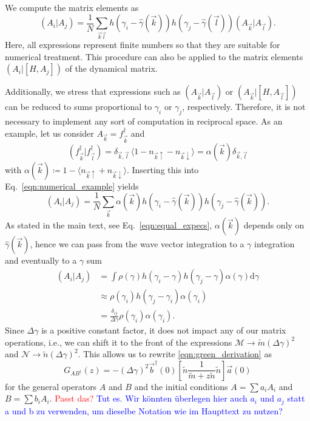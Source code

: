 \documentclass[
    reprint, 
    aps,
    preprintnumbers,
    twocolumn,
    prb,
    superscriptaddress
]{revtex4-2}
\newcommand{\vk}{\vec{k}}
\newcommand{\vl}{\vec{l}}
\newcommand{\dgamma}{\mathrm{d}\gamma}
\newcommand{\mM}{\mathcal{M}}
\newcommand{\mN}{\mathcal{N}}
\newcommand{\bs}{\begin{subequations}}
\newcommand{\es}{\end{subequations}}
\newcommand{\red}[1]{\textcolor{red}{#1}}
\newcommand{\blue}[1]{\textcolor{blue}{#1}}
\begin{document}
We compute the matrix elements as
\begin{equation}
    \label{eqn:numerical_example}
    (A_i | A_j) = \frac{1}{N} \sum_{\vk \vl} h(\gamma_i - \widehat{\gamma}(\vk)) h(\gamma_j - 
		\widehat{\gamma}(\vl)) (A_{\vk} | A_{\vl}).
\end{equation}
Here, all expressions represent finite numbers so that they are suitable for
numerical treatment. This procedure can also be applied to the matrix elements $(A_i | [H, A_j])$ of the dynamical matrix.


Additionally, we stress that expressions such as $(A_{\vk} | A_{\vl})$ or
$(A_{\vk} | [H, A_{\vl}])$ can be reduced to sums proportional to $\gamma_i$ or $\gamma_j$, respectively.
Therefore, it is not necessary to implement any sort of computation in reciprocal space.
As an example, let us consider $A_{\vk} = f_{\vk}^\dagger$ and 
\begin{equation}
    ( f_{\vk}^\dagger | f_{\vl}^\dagger ) = \delta_{\vk, \vl}\, \langle 1 - n_{\vk \uparrow} - n_{\vk \downarrow} \rangle = \alpha(\vk) \delta_{\vk, \vl}  
\end{equation}
with $\alpha(\vk)\coloneqq 1 - \langle n_{\vk \uparrow} + n_{\vk \downarrow} \rangle$. 
Inserting this into Eq.\ \eqref{eqn:numerical_example} yields
\begin{equation}
    (A_i | A_j) = \frac{1}{N} \sum_{\vk} \alpha(\vk) h(\gamma_i 
		- \widehat{\gamma}(\vk)) h(\gamma_j - \widehat{\gamma}(\vk)).
\end{equation}
As stated in the main text, see Eq.\ \eqref{eqn:equal_expecs}, $\alpha(\vk)$ depends only on $\widehat{\gamma}(\vk)$, 
hence we can pass from the wave vector integration to a $\gamma$ integration and eventually to a $\gamma$ sum
\bs
\begin{align}
    (A_i | A_j) &= \int \rho(\gamma) h(\gamma_i - \gamma) h(\gamma_j - \gamma) \alpha(\gamma) \dgamma 
      \\
    &\approx \rho(\gamma_i) h(\gamma_j - \gamma_i) \alpha(\gamma_i) 
			\\
    &= \frac{\delta_{ij}}{\Delta \gamma} \rho(\gamma_i) \alpha(\gamma_i).
\end{align}
\es
Since $\Delta \gamma$ is a positive constant factor, it does not impact any of our matrix operations, i.e., we can shift it to the front of the expressions $\mM \to \tilde{m} (\Delta \gamma)^2$ 
and $\mN \to \tilde{n} (\Delta \gamma)^2$.
This allows us to rewrite \eqref{eqn:green_derivation} as
\begin{equation}
    G_{AB^\dagger}(z) = - (\Delta \gamma)^2 \vec{b}^\dagger (0) \left[ \tilde{n} \frac{1}{\tilde{m} + z \tilde{n}} \tilde{n} \right] \vec{a}(0)
\end{equation}
for the general operators $A$ and $B$ and the initial conditions
$A=\sum a_i A_i$ and $B=\sum b_i A_i$. \red{Passt das?}  \blue{Tut es. Wir könnten überlegen hier auch $a_i$ und $a_j$ statt a und b zu verwenden, um dieselbe Notation wie im Haupttext zu nutzen?}
\end{document}
